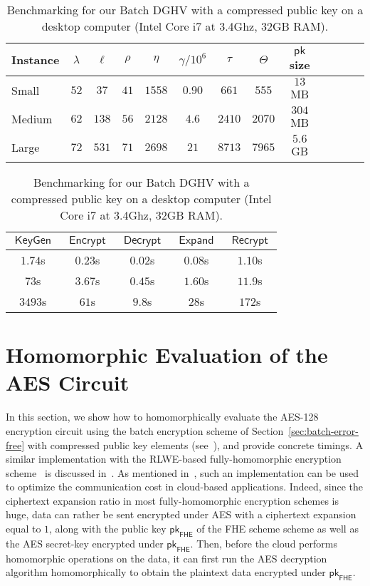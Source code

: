 \documentclass{llncs}
\DeclareMathOperator{\KeyGen}{\ensuremath{\mathsf{KeyGen}}}
\DeclareMathOperator{\Expand}{\ensuremath{\mathsf{Expand}}}
\DeclareMathOperator{\Encrypt}{\ensuremath{\mathsf{Encrypt}}}
\DeclareMathOperator{\Decrypt}{\ensuremath{\mathsf{Decrypt}}}
\DeclareMathOperator{\Recrypt}{\ensuremath{\mathsf{Recrypt}}}
\DeclareMathOperator{\Mult}{\ensuremath{\mathsf{Mult}}}
\newcommand*{\pk}{\ensuremath{\mathsf{pk}}}
\newcommand*{\FHE}{\ensuremath{\mathsf{FHE}}}
\begin{document}
\begin{table}[tb]\scriptsize\centering

\caption{Benchmarking for our Batch DGHV with a compressed public key
  on a desktop computer (Intel Core i7 at 3.4Ghz, 32GB RAM).}
\label{t:concparams}
\begin{tabular}{|l|c|c||c|c|c|c|c|c|c|c|c||r|}
\hline 
\textbf{Instance}&$\lambda$&$\ell$&$\rho$&$\eta$&$\gamma/ 10^{6}$&$\tau$&$\Theta$&$\pk$ size\\
\hline
\hline
Small&$52$&$37$&$41$&$1558$&$0.90$&$661$&$555$&$13$ MB\\\hline
Medium&$62$&$138$&$56$&$2128$&$4.6$&$2410$&$2070$&$304$ MB\\\hline
Large&$72$&$531$&$71$&$2698$&$21$&$8713$&$7965$&$5.6$ GB\\\hline
\end{tabular}\begin{tabular}{||c|c|c|c|c|}
\hline 
$\KeyGen$&$\Encrypt$&$\Decrypt$&
$\Expand$ & $\Recrypt$\\
\hline
\hline
$1.74$s&$0.23$s&$0.02$s&
$0.08$s&$1.10$s\\\hline
$73$s&$3.67$s&$0.45$s&
$1.60$s&$11.9$s\\\hline
$3493$s&$61$s&$9.8$s&
$28$s&$172$s\\\hline
\end{tabular}
\end{table}


\section{Homomorphic Evaluation of the AES Circuit}
\label{sec:HAES}

In this section, we show how to homomorphically evaluate the AES-128
encryption circuit using the batch encryption scheme of Section~\ref{sec:batch-error-free} with compressed public key elements (see~\cite{CLT2013a}), and provide
concrete timings. A similar
implementation with
 the RLWE-based 
fully-homomorphic encryption scheme~\cite{BV2011a,BV2011b,GHS2012a} is
discussed in~\cite{GHS2012c}. 
As mentioned 
in~\cite{SV2011,NLV2011,GHS2012c}, such an implementation can be used to
optimize the communication cost in cloud-based
applications. Indeed, since the ciphertext expansion ratio in most
fully-homomorphic encryption schemes is huge, data can rather be sent
encrypted under AES with a ciphertext expansion equal to $1$, along
with the public key $\pk_{\FHE}$ of the FHE scheme scheme as well as
the AES secret-key 
encrypted under $\pk_{\FHE}$. Then, before the cloud performs homomorphic operations
on the data, it can first run the AES decryption algorithm
homomorphically to obtain the plaintext data encrypted under
$\pk_{\FHE}$.
\end{document}

